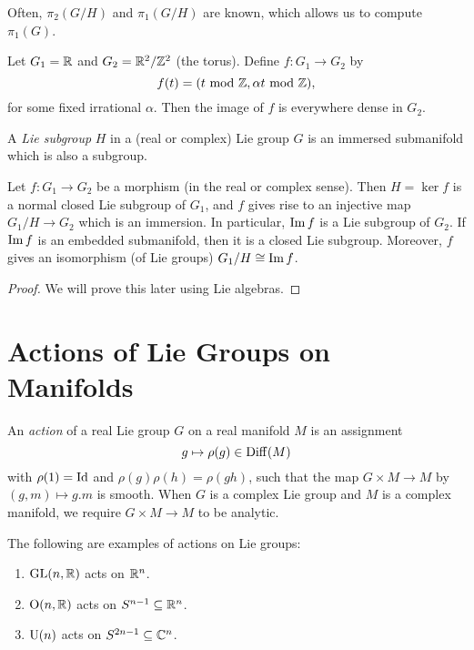 \begin{remark}
  Often, $\pi_2(G / H)$ and
  $\pi_1(G / H)$ are known, which allows
  us to compute $\pi_1(G)$.
\end{remark}

\begin{example}
  Let $G_1 = \mathbb{R}$ and $G_2 = \mathbb{R}^2 / \mathbb{Z}^2$
  (the torus). Define
  $f : G_1 \to G_2$ by
  \[
    f(t) = (t \ {\mathrm{mod}\ \mathbb{Z}}, \alpha t \ {\mathrm{mod}\ \mathbb{Z}}),
  \]
  for some fixed irrational $\alpha$. Then
  the image of $f$ is everywhere dense
  in $G_2$.
\end{example}

\begin{definition}
  A \emph{Lie subgroup} $H$ in a (real or
  complex)
  Lie group $G$ is an immersed submanifold
  which is also a subgroup.
\end{definition}

\begin{theorem}
  Let $f : G_1 \to G_2$ be a morphism
  (in the real or complex sense). Then
  $H = \ker f$ is a normal closed Lie
  subgroup of $G_1$, and $f$ gives rise
  to an injective map $G_1 / H \to G_2$
  which is an immersion. In particular,
  $\operatorname{Im} f$ is a Lie subgroup of $G_2$.
  If $\operatorname{Im} f$ is an embedded submanifold,
  then it is a closed Lie subgroup.
  Moreover, $f$ gives an isomorphism
  (of Lie groups)
  $G_1 / H \cong \operatorname{Im} f$.
\end{theorem}

\begin{proof}
  We will prove this later using
  Lie algebras.
\end{proof}

\section{Actions of Lie Groups on Manifolds}

\begin{definition}
  An \emph{action} of a real Lie group $G$
  on a real manifold $M$ is an
  assignment
  \[
    g \mapsto \rho(g) \in \operatorname{Diff}(M)
  \]
  with $\rho(1) = \operatorname{Id}$ and
  $\rho(g) \rho(h) = \rho(gh)$,
  such that
  the map $G \times M \to M$ by
  $(g, m) \mapsto g . m$ is smooth.
  When $G$ is a complex Lie group and $M$
  is a complex manifold, we require
  $G \times M \to M$ to be analytic.
\end{definition}

\begin{example}
  The following are examples of actions
  on Lie groups:
  \begin{enumerate}
    \item $\operatorname{GL}(n, \mathbb{R})$ acts on $\mathbb{R}^n$.
    \item $\operatorname{O}(n, \mathbb{R})$ acts on
      $S^{n - 1} \subseteq \mathbb{R}^n$.
    \item $\operatorname{U}(n)$ acts on
      $S^{2n - 1} \subseteq \mathbb{C}^n$.
  \end{enumerate}
\end{example}

